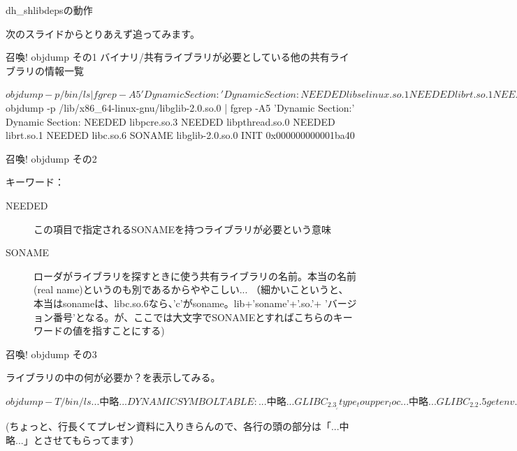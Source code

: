 \begin{frame}{dh\_shlibdepsの動作}

\begin{center}
\Large
 次のスライドからとりあえず追ってみます。
\end{center}

\end{frame}

\begin{frame}[containsverbatim]{召喚! objdump その1}
バイナリ/共有ライブラリが必要としている他の共有ライブラリの情報一覧
\begin{commandline}
$ objdump -p /bin/ls | fgrep -A5 'Dynamic Section:'
Dynamic Section:
  NEEDED               libselinux.so.1
  NEEDED               librt.so.1
  NEEDED               libacl.so.1
  NEEDED               libc.so.6
  INIT                 0x0000000000402298
$ objdump -p /lib/x86_64-linux-gnu/libglib-2.0.so.0  |
 fgrep -A5 'Dynamic Section:'
Dynamic Section:
  NEEDED               libpcre.so.3
  NEEDED               libpthread.so.0
  NEEDED               librt.so.1
  NEEDED               libc.so.6
  SONAME               libglib-2.0.so.0
  INIT                 0x000000000001ba40

\end{commandline}

\end{frame}

\begin{frame}{召喚! objdump その2}

キーワード：

\begin{description}
\item [NEEDED] この項目で指定されるSONAMEを持つライブラリが必要という意味
\item [SONAME] ローダがライブラリを探すときに使う共有ライブラリの名前。本当の名前(real name)というのも別であるからややこしい...
（細かいこというと、本当はsonameは、libc.so.6なら、'c'がsoname。lib+'soname'+'.so.'+
'バージョン番号'となる。が、ここでは大文字でSONAMEとすればこちらのキーワードの値を指すことにする)
\end{description}


\end{frame}

\begin{frame}[containsverbatim]{召喚! objdump その3}

ライブラリの中の何が必要か？を表示してみる。

\begin{commandline}
$ objdump -T /bin/ls 
　　　...中略...
DYNAMIC SYMBOL TABLE:
...中略... GLIBC_2.3   __ctype_toupper_loc
...中略... GLIBC_2.2.5 getenv
...中略... GLIBC_2.2.5 sigprocmask
...中略...　GLIBC_2.2.5 raise
　　　...中略...
$
\end{commandline}

(ちょっと、行長くてプレゼン資料に入りきらんので、各行の頭の部分は「...中略...」とさせてもらってます）

\end{frame}

